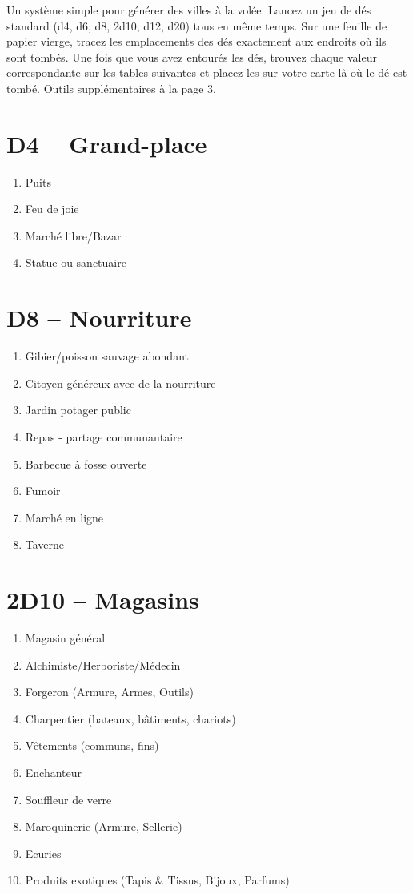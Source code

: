 \documentclass{article}
\begin{document}
\clearpage


Un système simple pour générer des villes à la volée. Lancez un jeu de dés standard (d4, d6, d8, 2d10, d12, d20) tous en même temps. Sur une feuille de papier vierge, tracez les emplacements des dés exactement aux endroits où ils sont tombés. Une fois que vous avez entourés les dés, trouvez chaque valeur correspondante sur les tables suivantes et placez-les sur votre carte là où le dé est tombé.  Outils supplémentaires à la page 3.


\begin{multicols}{2}
	\section*{D4 -- Grand-place}
	\begin{enumerate}
		\item Puits
		\item Feu de joie
		\item Marché libre/Bazar
		\item Statue ou sanctuaire
	\end{enumerate}
	\section*{D8 -- Nourriture}
	\begin{enumerate}
		\item Gibier/poisson sauvage abondant
		\item Citoyen généreux avec de la nourriture
		\item Jardin potager public
		\item Repas - partage communautaire 
		\item Barbecue à fosse ouverte
		\item Fumoir
		\item Marché en ligne
		\item Taverne
	\end{enumerate}
	\section*{2D10 -- Magasins}
	\begin{enumerate}
		\item Magasin général
		\item Alchimiste/Herboriste/Médecin
		\item Forgeron (Armure, Armes, Outils)
		\item Charpentier (bateaux, bâtiments, chariots)
		\item Vêtements (communs, fins)
		\item Enchanteur 
		\item Souffleur de verre
		\item Maroquinerie (Armure, Sellerie)
		\item Ecuries
		\item Produits exotiques (Tapis \& Tissus, Bijoux, Parfums)
	\end{enumerate}

\end{multicols}
\end{document}
